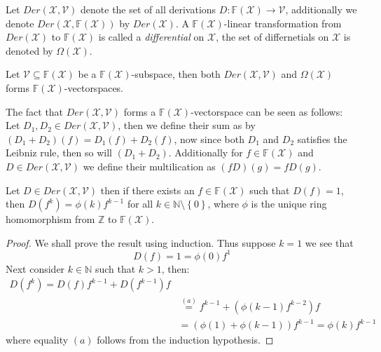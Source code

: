 \begin{definition}
  Let $Der(\mathcal{X}, \mathcal{V})$ denote the set of all derivations $D: \mathbb{F}(\mathcal{X}) \to \mathcal{V}$, additionally we denote $Der(\mathcal{X}, \mathbb{F}(\mathcal{X}))$ by $Der(\mathcal{X})$. A $\mathbb{F}(\mathcal{X})$-linear transformation from $Der(\mathcal{X})$ to $\mathbb{F}(\mathcal{X})$ is called a \textit{differential} on $\mathcal{X}$, the set of differnetials on $\mathcal{X}$ is denoted by $\Omega(\mathcal{X})$.
\end{definition}
Let $\mathcal{V} \subseteq \mathbb{F}(\mathcal{X})$ be a $\mathbb{F}(\mathcal{X})$-subspace, then both $Der(\mathcal{X}, \mathcal{V})$ and $\Omega(\mathcal{X})$ forms $\mathbb{F}(\mathcal{X})$-vectorspaces.

The fact that $Der(\mathcal{X}, \mathcal{V})$ forms a $\mathbb{F}(\mathcal{X})$-vectorspace can be seen as follows: Let $D_1, D_2 \in Der(\mathcal{X}, \mathcal{V})$, then we define their sum as by $(D_1 + D_2)(f) = D_1(f) + D_2(f)$, now since both $D_1$ and $D_2$ satisfies the Leibniz rule, then so will $(D_1 + D_2)$. Additionally for $f \in \mathbb{F}(\mathcal{X})$ and $D \in Der(\mathcal{X}, \mathcal{V})$ we define their multilication as $(fD)(g) = f D(g)$.

\begin{lemma}\label{lem:easy_lemma}
  Let $D \in Der(\mathcal{X}, \mathcal{V})$ then if there exists an $f \in \mathbb{F}(\mathcal{X})$ such that $D(f) = 1$, then $D(f^k) = \phi(k) f^{k - 1}$ for all $k \in \mathbb{N} \setminus \left\{0\right\}$, where $\phi$ is the unique ring homomorphism from $\mathbb{Z}$ to $\mathbb{F}(\mathcal{X})$.
\end{lemma}
\begin{proof}
  We shall prove the result using induction. Thus suppose $k = 1$ we see that
  \begin{equation*}
    D(f) = 1 = \phi(0)f^{1}
  \end{equation*}
  Next consider $k \in \mathbb{N}$ such that $k > 1$, then:
  \begin{align*}
     D(f^k) = D(f)f^{k - 1} + D(f^{k - 1})f\\ &\stackrel{(a)}{=} f^{k - 1} + (\phi(k -  1) f^{k - 2})f\\ &= (\phi(1) + \phi(k - 1))  f^{k - 1} = \phi(k) f^{k - 1}
  \end{align*}
  where equality $(a)$ follows from the induction hypothesis.
\end{proof}


